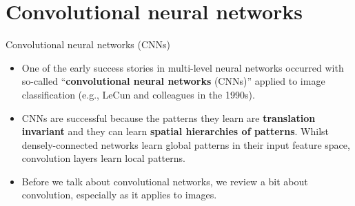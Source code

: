 \documentclass{beamer}
\begin{document}
\section{Convolutional neural networks}
\begin{frame}{Convolutional neural networks (CNNs)}
\begin{itemize}
\item One of the early success stories in multi-level neural networks occurred with so-called ``\textbf{convolutional neural networks} (CNNs)” applied to image classification (e.g., LeCun and colleagues in the 1990s).
\item CNNs are successful because the patterns they learn are \textbf{translation invariant} and they can learn \textbf{spatial hierarchies of patterns}. Whilst densely-connected networks learn global patterns in their input feature space, convolution layers learn local patterns.
\item Before we talk about convolutional networks, we review a bit about
convolution, especially as it applies to images.
\end{itemize}
\end{frame}
\end{document}
